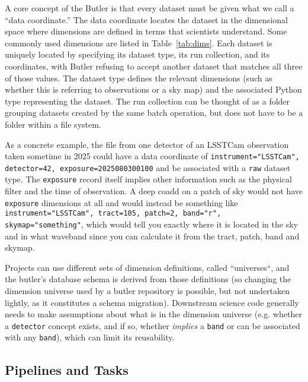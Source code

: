 A core concept of the Butler is that every dataset must be given what we call a ``data coordinate.''
The data coordinate locates the dataset in the dimensional space where dimensions are defined in terms that scientists understand.
Some commonly used dimensions are listed in Table~\ref{tab:dims}.
Each dataset is uniquely located by specifying its dataset type, its run collection, and its coordinates, with Butler refusing to accept another dataset that matches all three of those values.
The dataset type defines the relevant dimensions (such as whether this is referring to observations or a sky map) and the associated Python type representing the dataset.
The run collection can be thought of as a folder grouping datasets created by the same batch operation, but does not have to be a folder within a file system.

As a concrete example, the file from one detector of an LSSTCam observation taken sometime in 2025 could have a data coordinate of \texttt{instrument="LSSTCam", detector=42, exposure=2025080300100} and be associated with a \texttt{raw} dataset type.
The \texttt{exposure} record itself implies other information such as the physical filter and the time of observation.
A deep coadd on a patch of sky would not have \texttt{exposure} dimensions at all and would instead be something like \texttt{instrument="LSSTCam", tract=105, patch=2, band="r", skymap="something"}, which would tell you exactly where it is located in the sky and in what waveband since you can calculate it from the tract, patch, band and skymap.

Projects can use different sets of dimension definitions, called ``universes``, and the butler's database schema is derived from those definitions (so changing the dimension universe used by a butler repository is possible, but not undertaken lightly, as it constitutes a schema migration).
Downstream science code generally needs to make assumptions about what is in the dimension universe (e.g. whether a \texttt{detector} concept exists, and if so, whether \emph{implies} a \texttt{band} or can be associated with any \texttt{band}), which can limit its reusability.

\subsection{Pipelines and Tasks}

